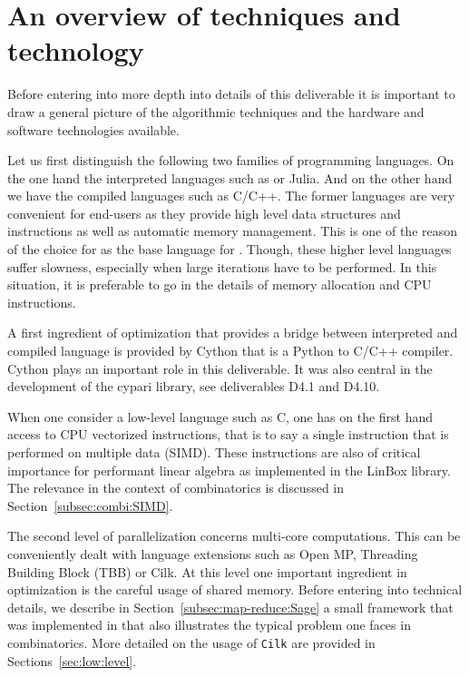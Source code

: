 \documentclass{deliverablereport}
\newcommand{\Cilk}{\texttt{Cilk}\xspace}
\begin{document}

\section{An overview of techniques and technology}

Before entering into more depth into details of this deliverable it is
important to draw a general picture of the algorithmic techniques
and the hardware and software technologies available.

Let us first distinguish the following two families of programming
languages. On the one hand the interpreted languages
such as \Python or Julia. And on the other hand we have the compiled languages
such as C/C++. The former languages are very convenient for end-users as
they provide high level data structures and instructions as well as automatic
memory management. This is one of the reason of the choice for \Python as the
base language for \Sage. Though, these higher level languages suffer slowness,
especially when large iterations have to be performed. In this situation, it is
preferable to go in the details of memory allocation and CPU instructions.

A first ingredient of optimization that provides a bridge between interpreted
and compiled language is provided by Cython that is a Python
to C/C++ compiler. Cython plays an important role in this deliverable. It
was also central in the development of the cypari library, see deliverables
D4.1 and D4.10.

When one consider a low-level language such as C, one has on the first hand
access to CPU vectorized instructions, that is to say a single instruction that
is performed on multiple data (SIMD). These
instructions are also of critical importance for performant linear
algebra as implemented in the LinBox library. The relevance in the context
of combinatorics is discussed in Section~\ref{subsec:combi:SIMD}.

The second level of parallelization concerns multi-core computations. This can
be conveniently dealt with language extensions such as Open MP,
Threading Building Block (TBB) or Cilk. At this level one important
ingredient in optimization is the careful usage of shared memory.
Before entering into technical details, we describe in
Section~\ref{subsec:map-reduce:Sage} a small framework that was
implemented in \Sage that also illustrates the typical problem one faces
in combinatorics. More detailed on the usage of \Cilk are provided
in Sections~\ref{sec:low:level}.
\end{document}
